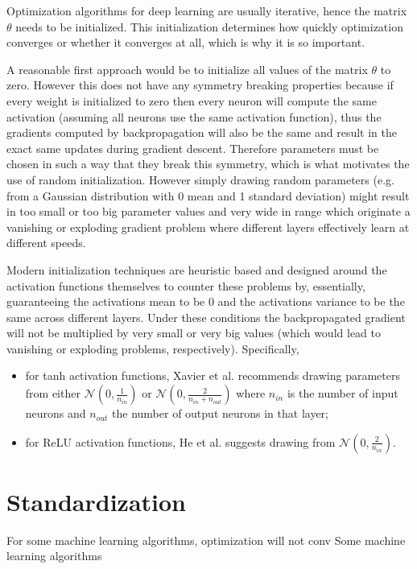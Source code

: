 Optimization algorithms for deep learning are usually iterative, hence the matrix $\theta$ needs to be initialized. This initialization determines how quickly optimization converges or whether it converges at all, which is why it is so important.

A reasonable first approach would be to initialize all values of the matrix $\theta$ to zero. However this does not have any symmetry breaking properties because if every weight is initialized to zero then every neuron will compute the same activation (assuming all neurons use the same activation function), thus the gradients computed by backpropagation will also be the same and result in the exact same updates during gradient descent. Therefore parameters must be chosen in such a way that they break this symmetry, which is what motivates the use of random initialization. However simply drawing random parameters (e.g. from a Gaussian distribution with 0 mean and 1 standard deviation) might result in too small or too big parameter values and very wide in range which originate a vanishing or exploding gradient problem where different layers effectively learn at different speeds.

Modern initialization techniques are heuristic based and designed around the activation functions themselves to counter these problems by, essentially, guaranteeing the activations mean to be $0$ and the activations variance to be the same across different layers. Under these conditions the backpropagated gradient will not be multiplied by very small or very big values (which would lead to vanishing or exploding problems, respectively). Specifically,

\begin{itemize}
    \item for tanh activation functions, Xavier et al.\cite{xavierinit} recommends drawing parameters from either $\mathcal{N}(0, \frac{1}{n_{in}})$ or $\mathcal{N}(0, \frac{2}{n_{in}+n_{out}})$ where $n_{in}$ is the number of input neurons and $n_{out}$ the number of output neurons in that layer;
    \item for ReLU activation functions, He et al.\cite{heinit} suggests drawing from $\mathcal{N}(0, \frac{2}{n_{in}})$.
\end{itemize}

\section{Standardization}

For some machine learning algorithms, optimization will not conv
Some machine learning algorithms

